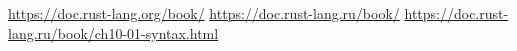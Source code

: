 \begin{thebibliography}{8}
     \url{https://doc.rust-lang.org/book/}
     \url{https://doc.rust-lang.ru/book/}
     \url{https://doc.rust-lang.ru/book/ch10-01-syntax.html}
\end{thebibliography}